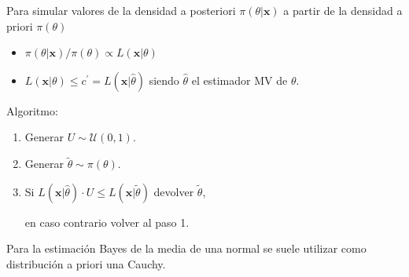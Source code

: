 \documentclass[]{book}
\theoremstyle{definition}
\theoremstyle{definition}
\theoremstyle{definition}
\theoremstyle{remark}
\let\BeginKnitrBlock\begin \let\EndKnitrBlock\end
\begin{document}
Para simular valores de la densidad a posteriori
\(\pi (\theta | \mathbf{x})\) a partir de la densidad a priori
\(\pi (\theta )\)

\begin{itemize}
\item
  \(\pi (\theta |\mathbf{x})/\pi (\theta )\propto L(\mathbf{x}|\theta )\)
\item
  \(L(\mathbf{x}|\theta )\leq c^{\prime }=L(\mathbf{x}|\hat{\theta})\)
  siendo \(\hat{\theta}\) el estimador MV de \(\theta\).
\end{itemize}

Algoritmo:

\begin{enumerate}
\def\labelenumi{\arabic{enumi}.}
\item
  Generar \(U\sim \mathcal{U}\left( 0,1\right)\).
\item
  Generar \(\tilde{\theta}\sim \pi (\theta )\).
\item
  Si
  \(L(\mathbf{x}|\hat{\theta})\cdot U \leq L(\mathbf{x}|\tilde{\theta})\)
  devolver \(\tilde{\theta}\),

  en caso contrario volver al paso 1.
\end{enumerate}

\BeginKnitrBlock{exercise}
\protect\hypertarget{exr:unnamed-chunk-15}{}{\label{exr:unnamed-chunk-15} }
\EndKnitrBlock{exercise}

Para la estimación Bayes de la media de una normal se suele utilizar
como distribución a priori una Cauchy.
\end{document}
